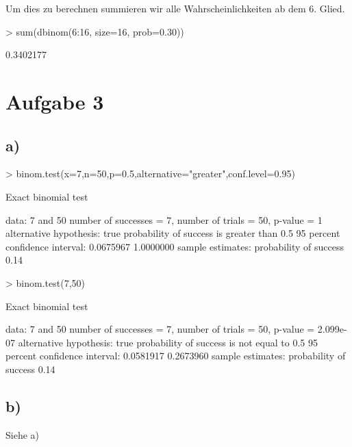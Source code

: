 Um dies zu berechnen summieren wir alle Wahrscheinlichkeiten ab dem 6. Glied.
\begin{Schunk}
\begin{Sinput}
> sum(dbinom(6:16, size=16, prob=0.30))
\end{Sinput}
\begin{Soutput}
[1] 0.3402177
\end{Soutput}
\end{Schunk}


\section{Aufgabe 3}

\subsection*{a)}
\begin{Schunk}
\begin{Sinput}
> binom.test(x=7,n=50,p=0.5,alternative="greater",conf.level=0.95)
\end{Sinput}
\begin{Soutput}
	Exact binomial test

data:  7 and 50 
number of successes = 7, number of trials = 50, p-value = 1
alternative hypothesis: true probability of success is greater than 0.5 
95 percent confidence interval:
 0.0675967 1.0000000 
sample estimates:
probability of success 
                  0.14 
\end{Soutput}
\begin{Sinput}
> binom.test(7,50)
\end{Sinput}
\begin{Soutput}
	Exact binomial test

data:  7 and 50 
number of successes = 7, number of trials = 50, p-value = 2.099e-07
alternative hypothesis: true probability of success is not equal to 0.5 
95 percent confidence interval:
 0.0581917 0.2673960 
sample estimates:
probability of success 
                  0.14 
\end{Soutput}
\end{Schunk}

\subsection*{b)}
Siehe a)
